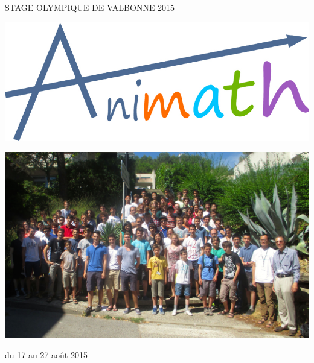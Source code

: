 

\begin{center}\LARGE{\textsc{STAGE OLYMPIQUE DE VALBONNE 2015}}
\vrule depth 0pt height 0.4pt width 16cm\end{center}



\begin{center}\includegraphics[scale=0.3]{logos/animath.jpg}
\end{center}



\begin{center}\includegraphics[width=16cm]{groupe.jpg}
\end{center}


\begin{center}\large{du 17 au 27 août 2015}\end{center}




